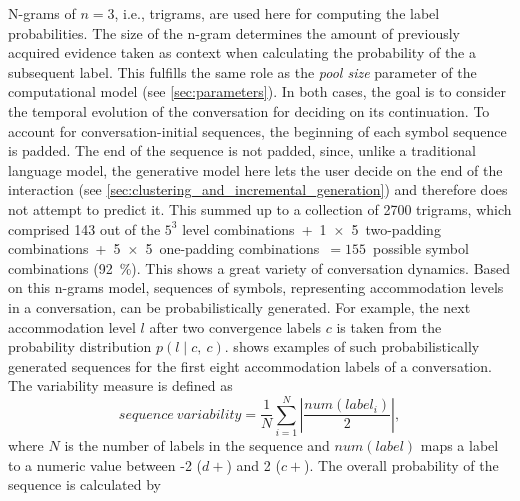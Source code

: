 N-grams of $n = 3$, i.e., trigrams, are used here for computing the label probabilities.
The size of the n-gram determines the amount of previously acquired evidence taken as context when calculating the probability of the a subsequent label.
This fulfills the same role as the \emph{pool size} parameter of the computational model (see \cref{sec:parameters}).
In both cases, the goal is to consider the temporal evolution of the conversation for deciding on its continuation.
To account for conversation-initial sequences, the beginning of each symbol sequence is padded.
The end of the sequence is not padded, since, unlike a traditional language model, the generative model here lets the user decide on the end of the interaction (see \cref{sec:clustering_and_incremental_generation}) and therefore does not attempt to predict it.
This summed up to a collection of \num{2700} trigrams, which comprised 143 out of the $5^3$ level combinations~+~1~$\times$~5~two-padding combinations~+~5~$\times$~5~one-padding combinations~$= 155$~possible symbol combinations (\SI{92}{\percent}).
This shows a great variety of conversation dynamics.
Based on this n-grams model, sequences of symbols, representing accommodation levels in a conversation, can be probabilistically generated.
For example, the next accommodation level $l$ after two convergence labels $c$ is taken from the probability distribution $p(l \mid c,\ c)$.
 shows examples of such probabilistically generated sequences for the first eight accommodation labels of a conversation.
The variability measure is defined as
%
\begin{equation}
	sequence\ variability = \frac{1}{N} \sum_{i=1}^{N} \left| \frac{num(label_i)}{2} \right|,
\end{equation}
\noindent
%
where $N$ is the number of labels in the sequence and $num(label)$ maps a label to a numeric value between -2 ($d+$) and 2 ($c+$).
The overall probability of the sequence is calculated by

